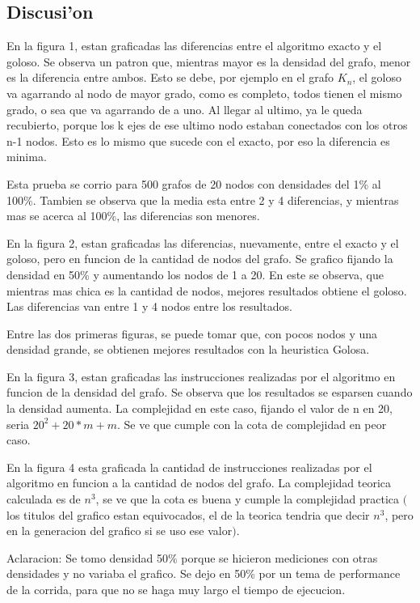 \subsection{Discusi'on}

En la figura 1, estan graficadas las diferencias entre el algoritmo exacto y el goloso. Se observa un patron que, mientras mayor es la densidad del grafo, menor es la diferencia entre ambos. Esto se debe, por ejemplo en el grafo $K_n$, el goloso va agarrando al nodo de mayor grado, como es completo, todos tienen el mismo grado, o sea que va agarrando de a uno. Al llegar al ultimo, ya le queda recubierto, porque los k ejes de ese ultimo nodo estaban conectados con los otros n-1 nodos. Esto es lo mismo que sucede con el exacto, por eso la diferencia es minima.


Esta prueba se corrio para 500 grafos de 20 nodos con densidades del 1\% al 100\%. Tambien se observa que la media esta entre 2 y 4 diferencias, y mientras mas se acerca al 100\%, las diferencias son menores.


En la figura 2, estan graficadas las diferencias, nuevamente, entre el exacto y el goloso, pero en funcion de la cantidad de nodos del grafo. Se grafico fijando la densidad en 50\% y aumentando los nodos de 1 a 20. En este se observa, que mientras mas chica es la cantidad de nodos, mejores resultados obtiene el goloso. Las diferencias van entre 1 y 4 nodos entre los resultados.


Entre las dos primeras figuras, se puede tomar que, con pocos nodos y una densidad grande, se obtienen mejores resultados con la heuristica Golosa.


En la figura 3, estan graficadas las instrucciones realizadas por el algoritmo en funcion de la densidad del grafo. Se observa que los resultados se esparsen cuando la densidad aumenta. La complejidad en este caso, fijando el valor de n en 20, seria $20^2+20*m+m$. Se ve que cumple con la cota de complejidad en peor caso.


En la figura 4 esta graficada la cantidad de instrucciones realizadas por el algoritmo en funcion a la cantidad de nodos del grafo. La complejidad teorica calculada es de $n^3$, se ve que la cota es buena y cumple la complejidad practica $($los titulos del grafico estan equivocados, el de la teorica tendria que decir $n^3$, pero en la generacion del grafico si se uso ese valor$)$. 


Aclaracion: Se tomo densidad 50\% porque se hicieron mediciones con otras densidades y no variaba el grafico. Se dejo en 50\% por un tema de performance de la corrida, para que no se haga muy largo el tiempo de ejecucion.